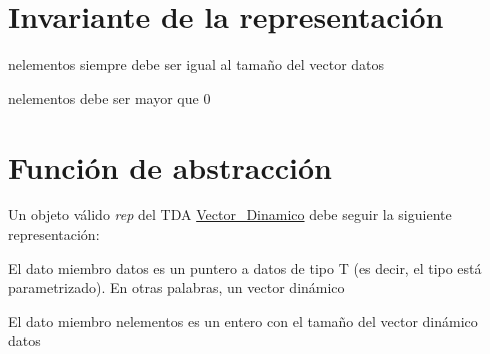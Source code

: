 \hypertarget{repVector_Dinamico_invVector_Dinamico}{}\section{Invariante de la representación}\label{repVector_Dinamico_invVector_Dinamico}

\begin{DoxyItemize}
\item nelementos siempre debe ser igual al tamaño del vector datos
\item nelementos debe ser mayor que 0 
\end{DoxyItemize}\hypertarget{repVector_Dinamico_faVector_Dinamico}{}\section{Función de abstracción}\label{repVector_Dinamico_faVector_Dinamico}
Un objeto válido {\itshape rep} del T\+DA \mbox{\hyperlink{classVector__Dinamico}{Vector\+\_\+\+Dinamico}} debe seguir la siguiente representación\+:
\begin{DoxyItemize}
\item El dato miembro datos es un puntero a datos de tipo T (es decir, el tipo está parametrizado). En otras palabras, un vector dinámico
\item El dato miembro nelementos es un entero con el tamaño del vector dinámico datos 
\end{DoxyItemize}